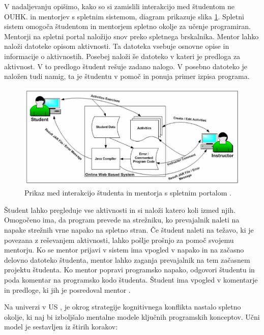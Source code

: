 V nadaljevanju opišimo, kako so si zamislili interakcijo med študentom
ne OUHK.  in mentorjev s spletnim sistemom, diagram prikazuje slika
\ref{fig:OUHK_workFlow}. Spletni sistem omogoča študentom in mentorjem
spletno okolje za učenje programiran. Mentorji na spletni portal
naložijo snov preko spletnega brskalnika. Mentor lahko naloži datoteke
opisom aktivnosti. Ta datoteka vsebuje osnovne opise in informacije o
aktivnostih. Posebej naloži še datoteko v kateri je predloga za
aktivnost. V to predlogo študent rešuje zadano nalogo. V posebno
datoteko je naložen tudi namig, ta je študentu v pomoč in ponuja
primer izpisa programa.

\begin{figure}[htb!] \centering
  \includegraphics[width=0.9\linewidth, keepaspectratio =
1]{./images/SystemArch02_OUHK_DistanceEdu.jpg}
\caption{Prikaz med interakcijo študenta in mentorja s spletnim
  portalom \cite{ITaLCP_DistanceEdu}.}
  \label{fig:OUHK_workFlow}
\end{figure}

Študent lahko pregleduje vse aktivnosti in si naloži katero koli izmed
njih. Omogočeno ima, da program prevede na strežniku, ko prevajalnik
naleti na napake strežnih vrne napako na spletno stran. Če študent
naleti na težavo, ki je povezana z reševanjem aktivnosti, lahko pošlje
prošnjo za pomoč svojemu mentorju. Ko se mentor prijavi v sistem ima
vpogled v napako in na začasno delovno datoteko študenta, mentor lahko
zaganja prevajalnik na tem začasnem projektu študenta. Ko mentor
popravi programsko napako, odgovori študentu in poda komentar na
programsko kodo študenta. Študent ima vpogled v komentarje in
predloge, ki jih je posredoval mentor \cite{ITaLCP_DistanceEdu}.


Na univerzi v US \cite{mentalModels}, je okrog strategije kognitivnega konflikta
nastalo spletno okolje, ki naj bi izboljšalo mentalne
modele ključnih programskih konceptov. Učni model je sestavljen iz
štirih korakov:

